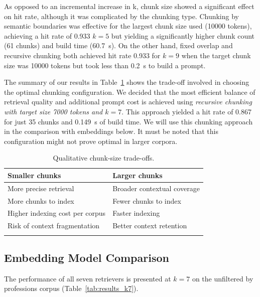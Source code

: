 \documentclass[pdflatex,sn-mathphys-num]{sn-jnl}
\theoremstyle{thmstyleone}
\theoremstyle{thmstyletwo}
\theoremstyle{thmstylethree}
\begin{document}
As opposed to an incremental increase in k, chunk size showed a significant effect on hit rate, although it was complicated by the chunking type. Chunking by semantic boundaries was effective for the largest chunk size used (10000 tokens), achieving a hit rate of 0.933 $k=5$ but yielding a significantly higher chunk count (61 chunks) and build time (60.7~s). On the other hand, fixed overlap and recursive chunking both achieved hit rate 0.933 for $k=9$ when the target chunk size was 10000 tokens but took less than 0.2~s to build a prompt.

The summary of our results in Table~\ref{tab:chunk_tradeoffs} shows the trade-off involved in choosing the optimal chunking configuration. We decided that the most efficient balance of retrieval quality and additional prompt cost is achieved using \textit{recursive chunking with target size 7000 tokens and $k=7$}. This approach yielded a hit rate of 0.867 for just 35 chunks and 0.149~s of build time. We will use this chunking approach in the comparison with embeddings below. It must be noted that this configuration might not prove optimal in larger corpora.

\begin{table}[h]
\caption{Qualitative chunk-size trade-offs.}
\label{tab:chunk_tradeoffs}
\centering
\begin{tabular}{@{}p{4cm}p{4cm}@{}}
\toprule
\textbf{Smaller chunks} & \textbf{Larger chunks} \\
\midrule
More precise retrieval & Broader contextual coverage \\
More chunks to index & Fewer chunks to index \\
Higher indexing cost per corpus & Faster indexing \\
Risk of context fragmentation & Better context retention \\
\botrule
\end{tabular}
\end{table}

\subsection{Embedding Model Comparison}

The performance of all seven retrievers is presented at $k = 7$ on the unfiltered by professions corpus (Table~\ref{tab:results_k7}).
\end{document}
